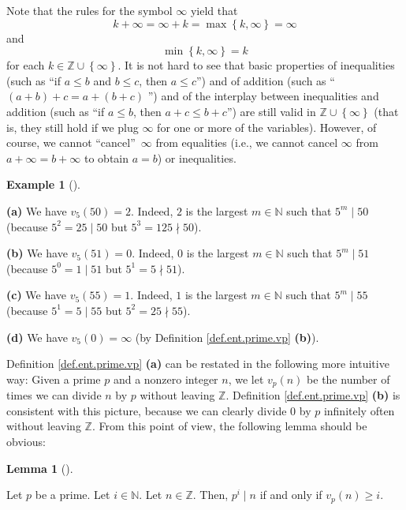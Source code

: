 \documentclass[numbers=enddot,12pt,final,onecolumn,notitlepage]{scrartcl}%
\numberwithin{exer}{subsection}
\theoremstyle{definition}
\newtheorem{lem}[theo]{Lemma}
\newenvironment{lemma}[1][]
{\begin{lem}[#1]\begin{leftbar}}
{\end{leftbar}\end{lem}}
\newtheorem{exam}[theo]{Example}
\newenvironment{example}[1][]
{\begin{exam}[#1]\begin{leftbar}}
{\end{leftbar}\end{exam}}
\begin{document}
Note that the rules for the symbol $\infty$ yield that%
\[
k+\infty=\infty+k=\max\left\{  k,\infty\right\}  =\infty
\]
and%
\[
\min\left\{  k,\infty\right\}  =k
\]
for each $k\in\mathbb{Z}\cup\left\{  \infty\right\}  $. It is not hard to see
that basic properties of inequalities (such as \textquotedblleft if $a\leq b$
and $b\leq c$, then $a\leq c$\textquotedblright) and of addition (such as
\textquotedblleft$\left(  a+b\right)  +c=a+\left(  b+c\right)  $%
\textquotedblright) and of the interplay between inequalities and addition
(such as \textquotedblleft if $a\leq b$, then $a+c\leq b+c$\textquotedblright)
are still valid in $\mathbb{Z}\cup\left\{  \infty\right\}  $ (that is, they
still hold if we plug $\infty$ for one or more of the variables). However, of
course, we cannot \textquotedblleft cancel\textquotedblright\ $\infty$ from
equalities (i.e., we cannot cancel $\infty$ from $a+\infty=b+\infty$ to obtain
$a=b$) or inequalities.

\begin{example}
\label{exa.ent.prime.vp}\textbf{(a)} We have $v_{5}\left(  50\right)  =2$.
Indeed, $2$ is the largest $m\in\mathbb{N}$ such that $5^{m}\mid50$ (because
$5^{2}=25\mid50$ but $5^{3}=125\nmid50$).

\textbf{(b)} We have $v_{5}\left(  51\right)  =0$. Indeed, $0$ is the largest
$m\in\mathbb{N}$ such that $5^{m}\mid51$ (because $5^{0}=1\mid51$ but
$5^{1}=5\nmid51$).

\textbf{(c)} We have $v_{5}\left(  55\right)  =1$. Indeed, $1$ is the largest
$m\in\mathbb{N}$ such that $5^{m}\mid55$ (because $5^{1}=5\mid55$ but
$5^{2}=25\nmid55$).

\textbf{(d)} We have $v_{5}\left(  0\right)  =\infty$ (by Definition
\ref{def.ent.prime.vp} \textbf{(b)}).
\end{example}

Definition \ref{def.ent.prime.vp} \textbf{(a)} can be restated in the
following more intuitive way: Given a prime $p$ and a nonzero integer $n$, we
let $v_{p}\left(  n\right)  $ be the number of times we can divide $n$ by $p$
without leaving $\mathbb{Z}$. Definition \ref{def.ent.prime.vp} \textbf{(b)}
is consistent with this picture, because we can clearly divide $0$ by $p$
infinitely often without leaving $\mathbb{Z}$. From this point of view, the
following lemma should be obvious:

\begin{lemma}
\label{lem.ent.prime.vp-def}Let $p$ be a prime. Let $i\in\mathbb{N}$. Let
$n\in\mathbb{Z}$. Then, $p^{i}\mid n$ if and only if $v_{p}\left(  n\right)
\geq i$.
\end{lemma}
\end{document}
